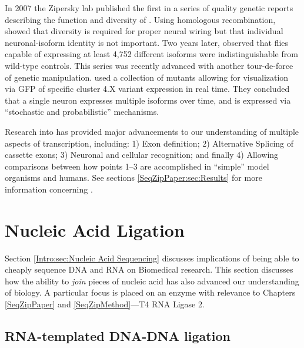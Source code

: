     In 2007 the Zipersky lab published \citep{Hattori2007} the first in a series of quality genetic reports describing the function and diversity of \dscam{}. Using homologous recombination, \citet{Hattori2007} showed that \dscam{} diversity is required for proper neural wiring but that individual neuronal-isoform identity is not important. Two years later, \citet{Hattori2009} observed that flies capable of expressing at least 4,752 different \dscam{} isoforms were indistinguishable from wild-type controls. This series was recently advanced with another tour-de-force of genetic manipulation. \citet{Miura2013b} used a collection of \dscam{} mutants allowing for visualization via GFP of specific cluster 4.X variant expression in real time. They concluded that a single neuron expresses multiple \dscam{} isoforms over time, and \dscam{} is expressed via ``stochastic and probabilistic'' mechanisms.

    Research into \flies{} \dscam{} has provided major advancements to our understanding of multiple aspects of transcription, including: 1) Exon definition; 2) Alternative Splicing of cassette exons; 3) Neuronal and cellular recognition; and finally 4) Allowing comparisons between how points 1--3 are accomplished in ``simple'' model organisms and humans. See sections \ref{SeqZipPaper:sec:Results} for more information concerning \dscam{}.

\section{Nucleic Acid Ligation}
  \label{Intro:sec:Nucleic Acid Ligation}

  Section \ref{Intro:sec:Nucleic Acid Sequencing} discusses implications of being able to cheaply sequence DNA and RNA on Biomedical research. This section discusses how the ability to \textit{join} pieces of nucleic acid has also advanced our understanding of biology. A particular focus is placed on an enzyme with relevance to Chapters \ref{SeqZipPaper} and \ref{SeqZipMethod}---T4 RNA Ligase 2.

  \subsection{RNA-templated DNA-DNA ligation}
    \label{Intro:subsec:Ligation}

